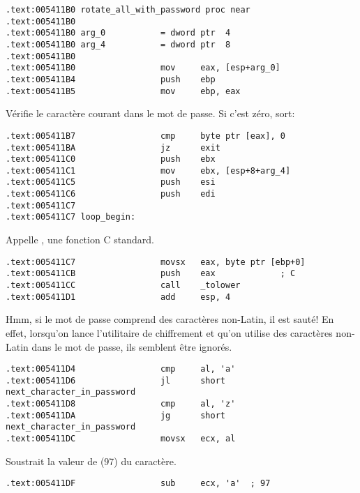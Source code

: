 \begin{lstlisting}[style=customasmx86]
.text:005411B0 rotate_all_with_password proc near
.text:005411B0
.text:005411B0 arg_0           = dword ptr  4
.text:005411B0 arg_4           = dword ptr  8
.text:005411B0
.text:005411B0                 mov     eax, [esp+arg_0]
.text:005411B4                 push    ebp
.text:005411B5                 mov     ebp, eax
\end{lstlisting}

Vérifie le caractère courant dans le mot de passe. Si c'est zéro, sort:

\begin{lstlisting}[style=customasmx86]
.text:005411B7                 cmp     byte ptr [eax], 0
.text:005411BA                 jz      exit
.text:005411C0                 push    ebx
.text:005411C1                 mov     ebx, [esp+8+arg_4]
.text:005411C5                 push    esi
.text:005411C6                 push    edi
.text:005411C7
.text:005411C7 loop_begin:
\end{lstlisting}

Appelle , une fonction C standard.

\begin{lstlisting}[style=customasmx86]
.text:005411C7                 movsx   eax, byte ptr [ebp+0]
.text:005411CB                 push    eax             ; C
.text:005411CC                 call    _tolower
.text:005411D1                 add     esp, 4
\end{lstlisting}

Hmm, si le mot de passe comprend des caractères non-Latin, il est sauté!
En effet, lorsqu'on lance l'utilitaire de chiffrement et qu'on utilise des caractères
non-Latin dans le mot de passe, ils semblent être ignorés.

\begin{lstlisting}[style=customasmx86]
.text:005411D4                 cmp     al, 'a'
.text:005411D6                 jl      short next_character_in_password
.text:005411D8                 cmp     al, 'z'
.text:005411DA                 jg      short next_character_in_password
.text:005411DC                 movsx   ecx, al
\end{lstlisting}

Soustrait la valeur de  (97) du caractère.

\begin{lstlisting}[style=customasmx86]
.text:005411DF                 sub     ecx, 'a'  ; 97
\end{lstlisting}

